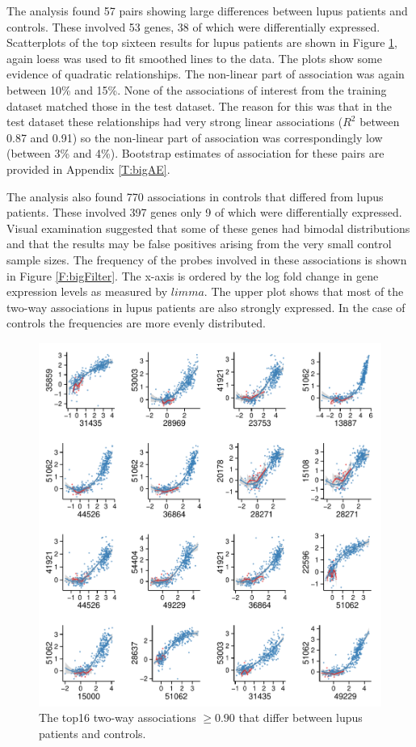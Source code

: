 \documentclass[a4paper, 12pt]{report}
\begin{document}
The analysis found 57 pairs showing large differences between lupus patients and controls. These involved 53 genes, 38 of which were differentially expressed.  Scatterplots of the top sixteen results for lupus patients are shown in Figure \ref{F:bigScatter}, again loess was used to fit smoothed lines to the data. The plots show some evidence of quadratic relationships. The non-linear part of association was again between 10\% and 15\%.  None of the associations of interest from the training dataset matched those in the test dataset. The reason for this was that in the test dataset these relationships had very strong linear associations ($R^2$ between 0.87 and 0.91) so the non-linear part of association was correspondingly low (between 3\% and 4\%). Bootstrap estimates of association for these pairs are provided in Appendix \ref{T:bigAE}.

The analysis also found 770 associations in controls that differed from lupus patients. These involved 397 genes only 9 of which were differentially expressed. Visual examination suggested that some of these genes had bimodal distributions and that the results may be false positives arising from the very small control sample sizes. The frequency of the probes involved in these associations is shown in Figure \ref{F:bigFilter}. The x-axis is ordered by the log fold change in gene expression levels as measured by $limma$. The upper plot shows that most of the two-way associations in lupus patients are also strongly expressed. In the case of controls the frequencies are more evenly distributed.

\begin{figure}[H]
\begin{center}
\includegraphics[width=\textwidth]{bigScatter}
\caption{The top16 two-way associations $\ge 0.90$ that differ between lupus patients and controls.} 
\label{F:bigScatter}
\end{center}
\end{figure}
\end{document}

